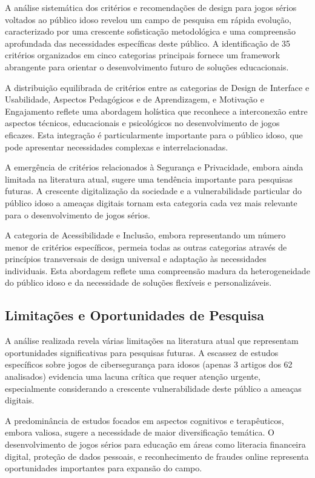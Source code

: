 \begin{table}[H]
A análise sistemática dos critérios e recomendações de design para jogos sérios voltados ao público idoso revelou um campo de pesquisa em rápida evolução, caracterizado por uma crescente sofisticação metodológica e uma compreensão aprofundada das necessidades específicas deste público. A identificação de 35 critérios organizados em cinco categorias principais fornece um framework abrangente para orientar o desenvolvimento futuro de soluções educacionais.

A distribuição equilibrada de critérios entre as categorias de Design de Interface e Usabilidade, Aspectos Pedagógicos e de Aprendizagem, e Motivação e Engajamento reflete uma abordagem holística que reconhece a interconexão entre aspectos técnicos, educacionais e psicológicos no desenvolvimento de jogos eficazes. Esta integração é particularmente importante para o público idoso, que pode apresentar necessidades complexas e interrelacionadas.

A emergência de critérios relacionados à Segurança e Privacidade, embora ainda limitada na literatura atual, sugere uma tendência importante para pesquisas futuras. A crescente digitalização da sociedade e a vulnerabilidade particular do público idoso a ameaças digitais tornam esta categoria cada vez mais relevante para o desenvolvimento de jogos sérios.

A categoria de Acessibilidade e Inclusão, embora representando um número menor de critérios específicos, permeia todas as outras categorias através de princípios transversais de design universal e adaptação às necessidades individuais. Esta abordagem reflete uma compreensão madura da heterogeneidade do público idoso e da necessidade de soluções flexíveis e personalizáveis.

\subsection{Limitações e Oportunidades de Pesquisa}
\label{subsec:limitacoes_oportunidades}

A análise realizada revela várias limitações na literatura atual que representam oportunidades significativas para pesquisas futuras. A escassez de estudos específicos sobre jogos de cibersegurança para idosos (apenas 3 artigos dos 62 analisados) evidencia uma lacuna crítica que requer atenção urgente, especialmente considerando a crescente vulnerabilidade deste público a ameaças digitais.

A predominância de estudos focados em aspectos cognitivos e terapêuticos, embora valiosa, sugere a necessidade de maior diversificação temática. O desenvolvimento de jogos sérios para educação em áreas como literacia financeira digital, proteção de dados pessoais, e reconhecimento de fraudes online representa oportunidades importantes para expansão do campo.


\end{table}

